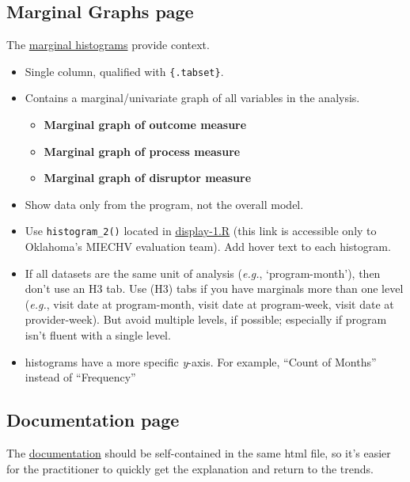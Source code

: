 \documentclass[
]{book}
\providecommand{\tightlist}{%
  \setlength{\itemsep}{0pt}\setlength{\parskip}{0pt}}
\begin{document}
\hypertarget{marginal-graphs-page}{%
\subsection{Marginal Graphs page}\label{marginal-graphs-page}}

The \href{https://ouhscbbmc.github.io/data-science-practices-1/dashboard-1.html\#marginals}{marginal histograms} provide context.

\begin{itemize}
\item
  Single column, qualified with \texttt{\{.tabset\}}.
\item
  Contains a marginal/univariate graph of all variables in the analysis.

  \begin{itemize}
  \tightlist
  \item
    \textbf{Marginal graph of outcome measure}
  \item
    \textbf{Marginal graph of process measure}
  \item
    \textbf{Marginal graph of disruptor measure}
  \end{itemize}
\item
  Show data only from the program, not the overall model.
\item
  Use \texttt{histogram\_2()} located in \href{https://github.com/OuhscBbmc/miechv-3/blob/master/analysis/common/display-1.R}{display-1.R} (this link is accessible only to Oklahoma's MIECHV evaluation team). Add hover text to each histogram.
\item
  If all datasets are the same unit of analysis (\emph{e.g.}, `program-month'), then don't use an H3 tab. Use (H3) tabs if you have marginals more than one level (\emph{e.g.}, visit date at program-month, visit date at program-week, visit date at provider-week). But avoid multiple levels, if possible; especially if program isn't fluent with a single level.
\item
  histograms have a more specific \emph{y}-axis. For example, ``Count of Months'' instead of ``Frequency''
\end{itemize}

\hypertarget{documentation-page}{%
\subsection{Documentation page}\label{documentation-page}}

The \href{https://ouhscbbmc.github.io/data-science-practices-1/dashboard-1.html\#documentation}{documentation} should be self-contained in the same html file, so it's easier for the practitioner to quickly get the explanation and return to the trends.
\end{document}
